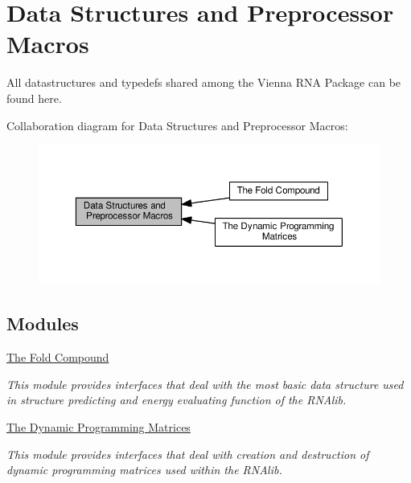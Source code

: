 \hypertarget{group__data__structures}{}\section{Data Structures and Preprocessor Macros}
\label{group__data__structures}


All datastructures and typedefs shared among the Vienna R\+N\+A Package can be found here.  


Collaboration diagram for Data Structures and Preprocessor Macros\+:
\nopagebreak
\begin{figure}[H]
\begin{center}
\leavevmode
\includegraphics[width=350pt]{group__data__structures}
\end{center}
\end{figure}
\subsection*{Modules}
\begin{DoxyCompactItemize}
\item 
\hyperlink{group__fold__compound}{The Fold Compound}
\begin{DoxyCompactList}\small\item\em This module provides interfaces that deal with the most basic data structure used in structure predicting and energy evaluating function of the R\+N\+Alib. \end{DoxyCompactList}\item 
\hyperlink{group__dp__matrices}{The Dynamic Programming Matrices}
\begin{DoxyCompactList}\small\item\em This module provides interfaces that deal with creation and destruction of dynamic programming matrices used within the R\+N\+Alib. \end{DoxyCompactList}\end{DoxyCompactItemize}
